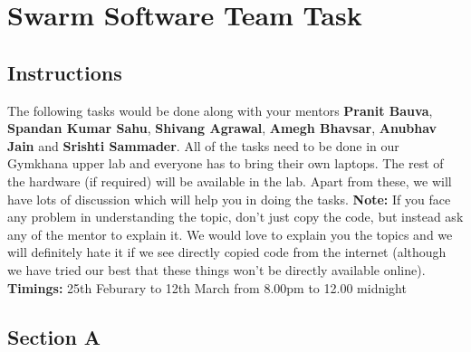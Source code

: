 \documentclass{article}
\begin{document}
\section*{Swarm Software Team Task}

\subsection*{Instructions} %
The following tasks would be done along with your mentors {\bf Pranit Bauva}, {\bf Spandan Kumar Sahu}, {\bf Shivang Agrawal}, {\bf Amegh Bhavsar}, {\bf Anubhav Jain} and {\bf Srishti Sammader}. All of the tasks need to be done in our Gymkhana upper lab and everyone has to bring their own laptops. The rest of the hardware (if required) will be available in the lab. Apart from these, we will have lots of discussion which will help you in doing the tasks. {\newline}{\newline}
{\bf Note:} If you face any problem in understanding the topic, don't just copy the code, but instead ask any of the mentor to explain it. We would love to explain you the topics and we will definitely hate it if we see directly copied code from the internet (although we have tried our best that these things won't be directly available online).
{\newline}{\newline}
{\bf Timings:} 25th Feburary to 12th March from 8.00pm to 12.00 midnight

\subsection*{Section A}
\end{document}
